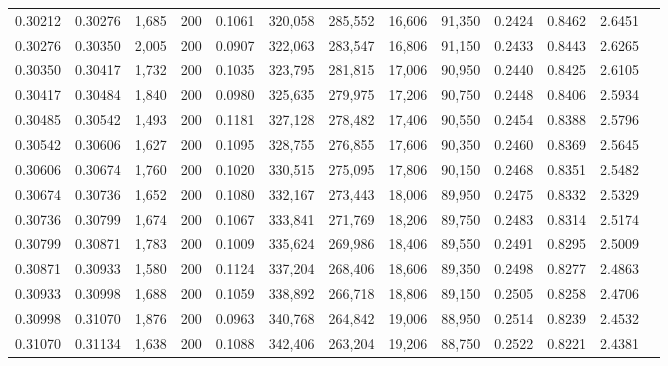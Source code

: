 \begin{tabular}{rrrrrrrrrrrrr}
0.30212 & 0.30276 &  1,685 & 200 &                                     0.1061 & 320,058 & 285,552 &  16,606 &  91,350 & 0.2424 & 0.8462 & 2.6451 \\
0.30276 & 0.30350 &  2,005 & 200 &                                     0.0907 & 322,063 & 283,547 &  16,806 &  91,150 & 0.2433 & 0.8443 & 2.6265 \\
0.30350 & 0.30417 &  1,732 & 200 &                                     0.1035 & 323,795 & 281,815 &  17,006 &  90,950 & 0.2440 & 0.8425 & 2.6105 \\
0.30417 & 0.30484 &  1,840 & 200 &                                     0.0980 & 325,635 & 279,975 &  17,206 &  90,750 & 0.2448 & 0.8406 & 2.5934 \\
0.30485 & 0.30542 &  1,493 & 200 &                                     0.1181 & 327,128 & 278,482 &  17,406 &  90,550 & 0.2454 & 0.8388 & 2.5796 \\
0.30542 & 0.30606 &  1,627 & 200 &                                     0.1095 & 328,755 & 276,855 &  17,606 &  90,350 & 0.2460 & 0.8369 & 2.5645 \\
0.30606 & 0.30674 &  1,760 & 200 &                                     0.1020 & 330,515 & 275,095 &  17,806 &  90,150 & 0.2468 & 0.8351 & 2.5482 \\
0.30674 & 0.30736 &  1,652 & 200 &                                     0.1080 & 332,167 & 273,443 &  18,006 &  89,950 & 0.2475 & 0.8332 & 2.5329 \\
0.30736 & 0.30799 &  1,674 & 200 &                                     0.1067 & 333,841 & 271,769 &  18,206 &  89,750 & 0.2483 & 0.8314 & 2.5174 \\
0.30799 & 0.30871 &  1,783 & 200 &                                     0.1009 & 335,624 & 269,986 &  18,406 &  89,550 & 0.2491 & 0.8295 & 2.5009 \\
0.30871 & 0.30933 &  1,580 & 200 &                                     0.1124 & 337,204 & 268,406 &  18,606 &  89,350 & 0.2498 & 0.8277 & 2.4863 \\
0.30933 & 0.30998 &  1,688 & 200 &                                     0.1059 & 338,892 & 266,718 &  18,806 &  89,150 & 0.2505 & 0.8258 & 2.4706 \\
0.30998 & 0.31070 &  1,876 & 200 &                                     0.0963 & 340,768 & 264,842 &  19,006 &  88,950 & 0.2514 & 0.8239 & 2.4532 \\
0.31070 & 0.31134 &  1,638 & 200 &                                     0.1088 & 342,406 & 263,204 &  19,206 &  88,750 & 0.2522 & 0.8221 & 2.4381 \\

\end{tabular}
